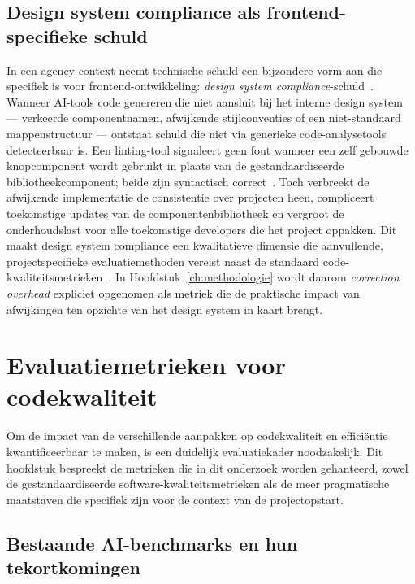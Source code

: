 \subsection{Design system compliance als frontend-specifieke schuld}
\label{subsec:design-system-schuld}

In een agency-context neemt technische schuld een bijzondere vorm aan die specifiek is voor frontend-ontwikkeling: \textit{design system compliance}-schuld~\autocite{Fang2024}. Wanneer AI-tools code genereren die niet aansluit bij het interne design system --- verkeerde componentnamen, afwijkende stijlconventies of een niet-standaard mappenstructuur --- ontstaat schuld die niet via generieke code-analysetools detecteerbaar is. Een linting-tool signaleert geen fout wanneer een zelf gebouwde knopcomponent wordt gebruikt in plaats van de gestandaardiseerde bibliotheekcomponent; beide zijn syntactisch correct~\autocite{Motiwala2026}. Toch verbreekt de afwijkende implementatie de consistentie over projecten heen, compliceert toekomstige updates van de componentenbibliotheek en vergroot de onderhoudslast voor alle toekomstige developers die het project oppakken. Dit maakt design system compliance een kwalitatieve dimensie die aanvullende, projectspecifieke evaluatiemethoden vereist naast de standaard code-kwaliteitsmetrieken~\autocite{Fang2024,Motiwala2026}. In Hoofdstuk~\ref{ch:methodologie} wordt daarom \textit{correction overhead} expliciet opgenomen als metriek die de praktische impact van afwijkingen ten opzichte van het design system in kaart brengt.

\section{Evaluatiemetrieken voor codekwaliteit}
\label{sec:evaluatiemetrieken}

Om de impact van de verschillende aanpakken op codekwaliteit en efficiëntie kwantificeerbaar te maken, is een duidelijk evaluatiekader noodzakelijk. Dit hoofdstuk bespreekt de metrieken die in dit onderzoek worden gehanteerd, zowel de gestandaardiseerde software-kwaliteitsmetrieken als de meer pragmatische maatstaven die specifiek zijn voor de context van de projectopstart.

\subsection{Bestaande AI-benchmarks en hun tekortkomingen}
\label{subsec:benchmarks-tekortkomingen}

